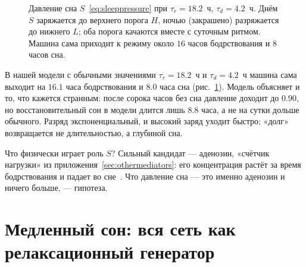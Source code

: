 \begin{figure}[t]
\centering
{}
\caption{Давление сна $S$~\eqref{eq:sleeppressure} при $\tau_r=18.2$~ч, $\tau_d=4.2$~ч. Днём $S$ заряжается до верхнего порога $H$, ночью (закрашено) разряжается до нижнего $L$; оба порога качаются вместе с суточным ритмом. Машина сама приходит к режиму около $16$ часов бодрствования и $8$ часов сна.}
\label{fig:twoprocess}
\end{figure}

В нашей модели с обычными значениями $\tau_r=18.2$~ч и $\tau_d=4.2$~ч машина сама выходит на $16.1$ часа бодрствования и $8.0$ часа сна (рис.~\ref{fig:twoprocess}). Модель объясняет и то, что кажется странным: после сорока часов без сна давление доходит до $0.90$, но восстановительный сон в модели длится лишь $8.8$ часа, а не на сутки дольше обычного. Разряд экспоненциальный, и высокий заряд уходит быстро; «долг» возвращается не длительностью, а глубиной сна.

Что физически играет роль $S$? Сильный кандидат --- аденозин, «счётчик нагрузки» из приложения~\ref{sec:othermediators}: его концентрация растёт за время бодрствования и падает во сне~\cite{PorkkaHeiskanen1997,Dunwiddie2001}. Что давление сна --- это именно аденозин и ничего больше, --- гипотеза.

\section{Медленный сон: вся сеть как релаксационный генератор}

